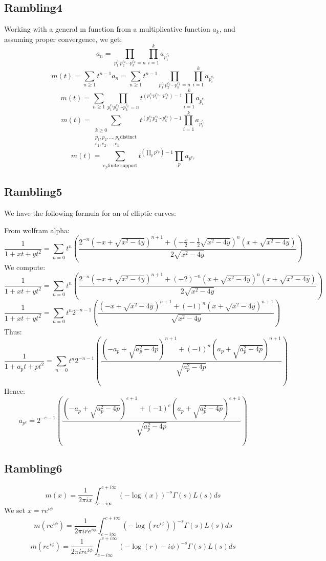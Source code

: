 \documentclass[a4paper]{amsart}
\begin{document}
\subsection{Rambling4}
Working with a general m function from a multiplicative function $a_k$, and assuming proper convergence, we get:
$$a_n = \prod_{p_1^{e_1}p_2^{e_2}\cdots p_k^{e_k} = n} \prod_{i = 1}^k a_{p_i^{e_i}}$$
$$m(t) = \sum_{n \ge 1}t^{n - 1}a_n = \sum_{n \ge 1}t^{n - 1} \prod_{p_1^{e_1}p_2^{e_2}\cdots p_k^{e_k} = n} \prod_{i = 1}^k a_{p_i^{e_i}}$$
$$m(t) = \sum_{n \ge 1} \prod_{p_1^{e_1}p_2^{e_2}\cdots p_k^{e_k} = n} t^{(p_1^{e_1}p_2^{e_2}\cdots p_k^{e_k}) - 1} \prod_{i = 1}^k a_{p_i^{e_i}}$$
$$m(t) = \sum_{\substack{k \ge 0 \\ p_1, p_2, \ldots, p_k \text{distinct} \\ e_1, e_2, \ldots, e_k}} t^{(p_1^{e_1}p_2^{e_2}\cdots p_k^{e_k}) - 1} \prod_{i = 1}^k a_{p_i^{e_i}}$$
$$m(t) = \sum_{e_p \text{finite support}} t^{(\prod_p p^{e_p}) - 1} \prod_p a_{p^{e_p}}$$


\subsection{Rambling5}
We have the following formula for an of elliptic curves:

From wolfram alpha:
$$\frac{1}{1 + xt + yt^2} = \sum_{n = 0}t^n\left(\frac{2^{-n}\left(-x + \sqrt{x^2 - 4y}\right)^{n + 1} + \left(-\frac{x}{2} - \frac{1}{2}\sqrt{x^2 - 4y}\right)^n\left(x + \sqrt{x^2 - 4y}\right)}{2\sqrt{x^2 - 4y}}\right)$$
We compute:
$$\frac{1}{1 + xt + yt^2} = \sum_{n = 0}t^n\left(\frac{2^{-n}\left(-x + \sqrt{x^2 - 4y}\right)^{n + 1} + (-2)^{-n}\left(x + \sqrt{x^2 - 4y}\right)^n\left(x + \sqrt{x^2 - 4y}\right)}{2\sqrt{x^2 - 4y}}\right)$$
$$\frac{1}{1 + xt + yt^2} = \sum_{n = 0}t^n2^{-n - 1}\left(\frac{\left(-x + \sqrt{x^2 - 4y}\right)^{n + 1} + (-1)^n\left(x + \sqrt{x^2 - 4y}\right)^{n + 1}}{\sqrt{x^2 - 4y}}\right)$$
Thus:
$$\frac{1}{1 + a_pt + pt^2} = \sum_{n = 0}t^n2^{-n - 1}\left(\frac{\left(-a_p + \sqrt{a_p^2 - 4p}\right)^{n + 1} + (-1)^n\left(a_p + \sqrt{a_p^2 - 4p}\right)^{n + 1}}{\sqrt{a_p^2 - 4p}}\right)$$
Hence:
$$a_{p^e} = 2^{-e - 1}\left(\frac{\left(-a_p + \sqrt{a_p^2 - 4p}\right)^{e + 1} + (-1)^e\left(a_p + \sqrt{a_p^2 - 4p}\right)^{e + 1}}{\sqrt{a_p^2 - 4p}}\right)$$


\subsection{Rambling6}
$$m(x) = \frac{1}{2\pi i x} \int_{c - i\infty}^{c + i\infty}(-\log(x))^{-s} \Gamma(s)L(s)ds$$
We set $x = re^{i\phi}$
$$m(re^{i\phi}) = \frac{1}{2\pi i re^{i\phi}} \int_{c - i\infty}^{c + i\infty}(-\log(re^{i\phi}))^{-s} \Gamma(s)L(s)ds$$
$$m(re^{i\phi}) = \frac{1}{2\pi i re^{i\phi}} \int_{c - i\infty}^{c + i\infty}(-\log(r) - i\phi)^{-s} \Gamma(s)L(s)ds$$
\end{document}

